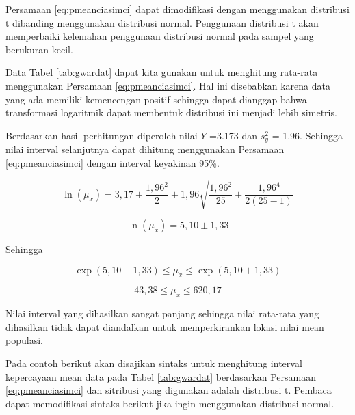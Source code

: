 \documentclass[]{book}
\begin{document}
Persamaan \eqref{eq:pmeanciasimci} dapat dimodifikasi dengan menggunakan
distribusi t dibanding menggunakan distribusi normal. Penggunaan
distribusi t akan memperbaiki kelemahan penggunaan distribusi normal
pada sampel yang berukuran kecil.

Data Tabel \ref{tab:gwardat} dapat kita gunakan untuk menghitung
rata-rata menggunakan Persamaan \eqref{eq:pmeanciasimci}. Hal ini
disebabkan karena data yang ada memiliki kemencengan positif sehingga
dapat dianggap bahwa transformasi logaritmik dapat membentuk distribusi
ini menjadi lebih simetris.

Berdasarkan hasil perhitungan diperoleh nilai \(\overline{Y}\) =3.173
dan \(s^2_y\) = 1.96. Sehingga nilai interval selanjutnya dapat dihitung
menggunakan Persamaan \eqref{eq:pmeanciasimci} dengan interval keyakinan
95\%.

\[
  \ln\left(\mu_x\right)=3,17+\frac{1,96^2}{2}\pm1,96\sqrt{\frac{1,96^2}{25}+\frac{1,96^4}{2\left(25-1\right)}}
\]

\[
  \ln\left(\mu_x\right)=5,10\pm1,33
\]

Sehingga

\[
  \exp\left(5,10-1,33\right)\le\mu_x\le\exp\left(5,10+1,33\right)
\]

\[
  43,38\le\mu_x\le620,17
\]

Nilai interval yang dihasilkan sangat panjang sehingga nilai rata-rata
yang dihasilkan tidak dapat diandalkan untuk memperkirankan lokasi nilai
mean populasi.

Pada contoh berikut akan disajikan sintaks untuk menghitung interval
kepercayaan mean data pada Tabel \ref{tab:gwardat} berdasarkan Persamaan
\eqref{eq:pmeanciasimci} dan sitribusi yang digunakan adalah distribusi t.
Pembaca dapat memodifikasi sintaks berikut jika ingin menggunakan
distribusi normal.
\end{document}

